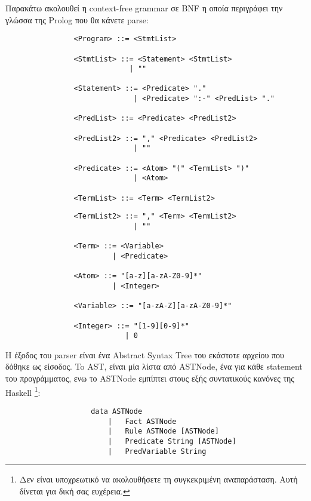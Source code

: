 \documentclass[10pt]{article}
\begin{document}
Παρακάτω ακολουθεί η context-free grammar σε BNF η οποία περιγράφει την γλώσσα της Prolog που θα κάνετε parse:


\begin{verbatim}
                <Program> ::= <StmtList>

                <StmtList> ::= <Statement> <StmtList>
                             | ""
                                  
                <Statement> ::= <Predicate> "."
                              | <Predicate> ":-" <PredList> "."
                           
                <PredList> ::= <Predicate> <PredList2>

                <PredList2> ::= "," <Predicate> <PredList2>
                              | ""
                     
                <Predicate> ::= <Atom> "(" <TermList> ")"
                              | <Atom>
                        
                <TermList> ::= <Term> <TermList2>
\end{verbatim}
\begin{verbatim}
                <TermList2> ::= "," <Term> <TermList2>
                              | ""
                        
                <Term> ::= <Variable>
                         | <Predicate>
                    
                <Atom> ::= "[a-z][a-zA-Z0-9]*"
                         | <Integer>

                <Variable> ::= "[a-zA-Z][a-zA-Z0-9]*"

                <Integer> ::= "[1-9][0-9]*"
                            | 0
\end{verbatim}





H έξοδος του parser είναι ένα Abstract Syntax Tree του εκάστοτε αρχείου που δόθηκε ως είσοδος. To AST, είναι μία λίστα από ASTNode, ένα για κάθε statement του προγράμματος, ενω το ASTNode εμπίπτει στους εξής συντατικούς κανόνες της Haskell \footnote{Δεν είναι υποχρεωτικό να ακολουθήσετε τη συγκεκριμένη αναπαράσταση. Αυτή δίνεται για δική σας ευχέρεια.}:

\begin{verbatim}
                    data ASTNode
                        |   Fact ASTNode
                        |   Rule ASTNode [ASTNode]
                        |   Predicate String [ASTNode]
                        |   PredVariable String
\end{verbatim}
\end{document}
